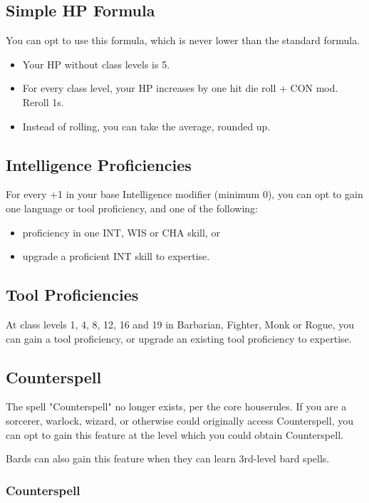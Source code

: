\documentclass[letterpaper,twocolumn,openany,nodeprecatedcode,bg=print]{dndbook}
\begin{document}
\subsection{Simple HP Formula}
You can opt to use this formula, which is never lower than the standard formula.
\begin{itemize}
\item Your HP without class levels is 5.
\item For every class level, your HP increases by one hit die roll + CON mod. Reroll 1s. 
\item Instead of rolling, you can take the average, rounded up.
\end{itemize}
\subsection{Intelligence Proficiencies}
For every +1 in your base Intelligence modifier (minimum 0), 
you can opt to gain one language or tool proficiency, and one of the following:
\begin{itemize}
    \item proficiency in one INT, WIS or CHA skill, or
    \item upgrade a proficient INT skill to expertise.
\end{itemize}

\subsection{Tool Proficiencies}
At class levels 1, 4, 8, 12, 16 and 19 in Barbarian, Fighter, Monk or Rogue, 
you can gain a tool proficiency, or upgrade an existing tool proficiency to expertise. 

\subsection{Counterspell}
\label{counterspell}
The spell "Counterspell" no longer exists, per the core houserules.
If you are a sorcerer, warlock, wizard, or otherwise could originally access Counterspell,
you can opt to gain this feature at the level which you could obtain Counterspell.

Bards can also gain this feature when they can learn 3rd-level bard spells.

\subsubsection{Counterspell}
\end{document}

